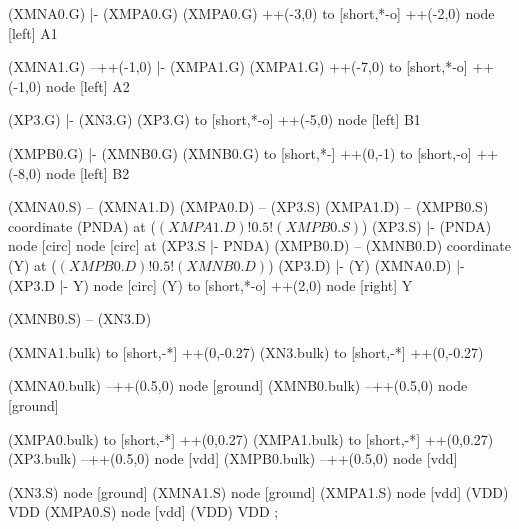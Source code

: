 \begin{circuitikz}[american]

	(XMNA0.G) |- (XMPA0.G)
	(XMPA0.G) ++(-3,0) to [short,*-o] ++(-2,0) node [left] {A1}

	(XMNA1.G) --++(-1,0) |- (XMPA1.G)
	(XMPA1.G) ++(-7,0) to [short,*-o] ++(-1,0) node [left] {A2}
	
	(XP3.G) |- (XN3.G)
	(XP3.G) to [short,*-o] ++(-5,0) node [left] {B1}
	
	(XMPB0.G) |- (XMNB0.G)
	(XMNB0.G) to [short,*-] ++(0,-1) to [short,-o] ++(-8,0) node [left] {B2}
	
	(XMNA0.S) -- (XMNA1.D)
	(XMPA0.D) -- (XP3.S)
	(XMPA1.D) -- (XMPB0.S)
	coordinate (PNDA) at ($(XMPA1.D)!0.5!(XMPB0.S)$) 
	(XP3.S) |- (PNDA) node [circ] {}
	node [circ] at  (XP3.S |- PNDA){}
	(XMPB0.D) -- (XMNB0.D)
	coordinate (Y) at ($(XMPB0.D)!0.5!(XMNB0.D)$)
	(XP3.D) |- (Y)
	(XMNA0.D) |- (XP3.D |- Y) node [circ]{}
	(Y) to [short,*-o] ++(2,0) node [right] {Y}
	
	(XMNB0.S) -- (XN3.D)
	
	(XMNA1.bulk) to [short,-*] ++(0,-0.27)
	(XN3.bulk) to [short,-*] ++(0,-0.27)
	
	(XMNA0.bulk) --++(0.5,0) node [ground]{}
	(XMNB0.bulk) --++(0.5,0) node [ground]{}
	
	(XMPA0.bulk) to [short,-*] ++(0,0.27)
	(XMPA1.bulk) to [short,-*] ++(0,0.27)
	(XP3.bulk) --++(0.5,0) node [vdd]{}
	(XMPB0.bulk) --++(0.5,0) node [vdd]{}
	

	(XN3.S) node [ground] {}
	(XMNA1.S) node [ground] {}
	(XMPA1.S) node [vdd] (VDD) {VDD}
	(XMPA0.S) node [vdd] (VDD) {VDD}
;

\end{circuitikz}
